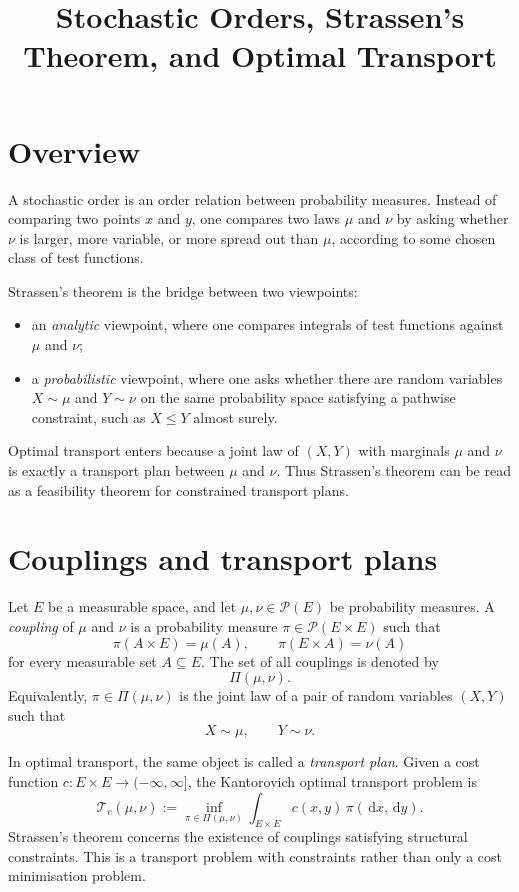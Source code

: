 \documentclass[11pt]{article}
\title{Stochastic Orders, Strassen's Theorem, and Optimal Transport}
\author{}
\date{}
\newcommand{\Pcal}{\mathcal P}
\newcommand{\dd}{\,\mathrm d}
\newcommand{\PiC}{\Pi}
\begin{document}
\maketitle

\section{Overview}

A stochastic order is an order relation between probability measures. Instead of
comparing two points \(x\) and \(y\), one compares two laws \(\mu\) and \(\nu\)
by asking whether \(\nu\) is larger, more variable, or more spread out than
\(\mu\), according to some chosen class of test functions.

Strassen's theorem is the bridge between two viewpoints:
\begin{itemize}[leftmargin=2em]
    \item an \emph{analytic} viewpoint, where one compares integrals of test
    functions against \(\mu\) and \(\nu\);
    \item a \emph{probabilistic} viewpoint, where one asks whether there are
    random variables \(X\sim\mu\) and \(Y\sim\nu\) on the same probability space
    satisfying a pathwise constraint, such as \(X\leq Y\) almost surely.
\end{itemize}

Optimal transport enters because a joint law of \((X,Y)\) with marginals
\(\mu\) and \(\nu\) is exactly a transport plan between \(\mu\) and \(\nu\).
Thus Strassen's theorem can be read as a feasibility theorem for constrained
transport plans.

\section{Couplings and transport plans}

Let \(E\) be a measurable space, and let \(\mu,\nu\in\Pcal(E)\) be probability
measures. A \emph{coupling} of \(\mu\) and \(\nu\) is a probability measure
\(\pi\in\Pcal(E\times E)\) such that
\[
        \pi(A\times E)=\mu(A),
        \qquad
        \pi(E\times A)=\nu(A)
\]
for every measurable set \(A\subseteq E\). The set of all couplings is denoted
by
\[
        \PiC(\mu,\nu).
\]
Equivalently, \(\pi\in\PiC(\mu,\nu)\) is the joint law of a pair of random
variables \((X,Y)\) such that
\[
        X\sim\mu,
        \qquad
        Y\sim\nu.
\]

In optimal transport, the same object is called a \emph{transport plan}. Given a
cost function \(c:E\times E\to (-\infty,\infty]\), the Kantorovich optimal
transport problem is
\[
        \mathcal T_c(\mu,\nu)
        :=
        \inf_{\pi\in\PiC(\mu,\nu)}
        \int_{E\times E} c(x,y)\,\pi(\dd x,\dd y).
\]
Strassen's theorem concerns the existence of couplings satisfying structural
constraints. This is a transport problem with constraints rather than only a
cost minimisation problem.
\end{document}
